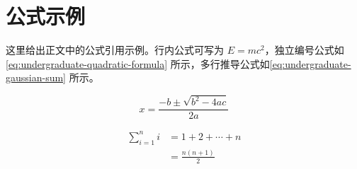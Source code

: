 \section{公式示例}
这里给出正文中的公式引用示例。行内公式可写为 $E=mc^2$，独立编号公式如\autoref{eq:undergraduate-quadratic-formula} 所示，多行推导公式如\autoref{eq:undergraduate-gaussian-sum} 所示。

\begin{equation}
    x = \frac{-b \pm \sqrt{b^2 - 4ac}}{2a}
    \label{eq:undergraduate-quadratic-formula}
\end{equation}

\begin{equation}
    \begin{aligned}
        \sum_{i=1}^{n} i &= 1 + 2 + \cdots + n \\
                         &= \frac{n(n+1)}{2}
    \end{aligned}
    \label{eq:undergraduate-gaussian-sum}
\end{equation}
